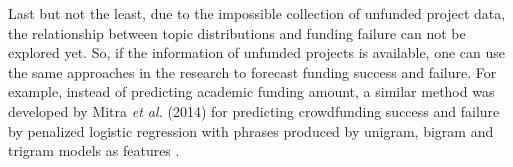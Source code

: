 Last but not the least, due to the impossible collection of unfunded project data, the relationship between topic distributions and funding failure can not be explored yet. So, if the information of unfunded projects is available, one can use the same approaches in the research to forecast funding success and failure. For example, instead of predicting academic funding amount, a similar method was developed by Mitra \textit{et al.} (2014) for predicting crowdfunding success and failure by penalized logistic regression with phrases produced by unigram, bigram and trigram models as features \cite{mitra2014}.
